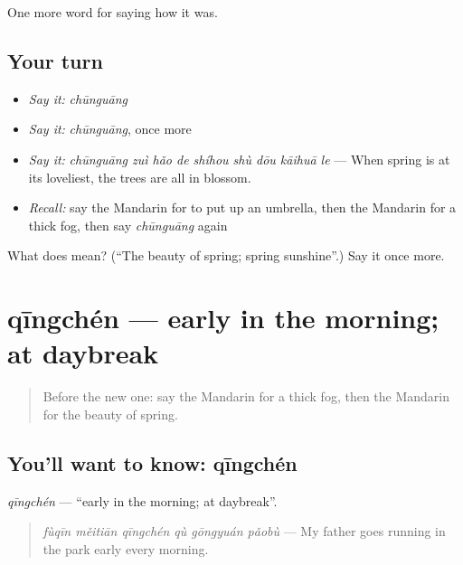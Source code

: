 \begin{grammarlens}[title={What you've built}]
One more word for saying how it was.
\end{grammarlens}

\subsection*{Your turn}
\begin{itemize}
\raggedright
  \item \emph{Say it:} \emph{chūnguāng}
  \item \emph{Say it:} \emph{chūnguāng}, once more
  \item \emph{Say it:} \emph{chūnguāng zuì hǎo de shíhou shù dōu kāihuā le} — When spring is at its loveliest, the trees are all in blossom.
  \item \emph{Recall:} say the Mandarin for to put up an umbrella, then the Mandarin for a thick fog, then say \emph{chūnguāng} again
\end{itemize}

\begin{tcolorbox}[breakable,colback=teal!4,colframe=teal!35!black,title={Before you move on}]
What does  mean? (\textquotedblleft{}The beauty of spring; spring sunshine\textquotedblright{}.) Say it once more.
\end{tcolorbox}
\section[qīngchén]{qīngchén — early in the morning; at daybreak}

\label{lesson:ZH-C519-qingchen}



\begin{quote}
Before the new one: say the Mandarin for a thick fog, then the Mandarin for the beauty of spring.
\end{quote}

\subsection*{You'll want to know: qīngchén}
\emph{qīngchén} — \textquotedblleft{}early in the morning; at daybreak\textquotedblright{}.

\begin{quote}
\emph{fùqīn měitiān qīngchén qù gōngyuán pǎobù} — My father goes running in the park early every morning.
\end{quote}

